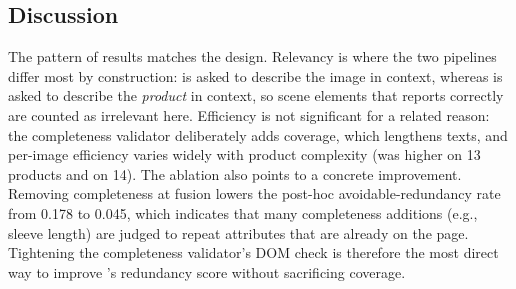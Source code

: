 \subsection{Discussion}
The pattern of results matches the design. Relevancy is where the two pipelines differ most by construction: \base is asked to describe the image in context, whereas \sys is asked to describe the \emph{product} in context, so scene elements that \base reports correctly are counted as irrelevant here. Efficiency is not significant for a related reason: the completeness validator deliberately adds coverage, which lengthens \sys texts, and per-image efficiency varies widely with product complexity (\sys was higher on 13 products and \base on 14). The ablation also points to a concrete improvement. Removing completeness at fusion lowers the post-hoc avoidable-redundancy rate from 0.178 to 0.045, which indicates that many completeness additions (e.g., sleeve length) are judged to repeat attributes that are already on the page. Tightening the completeness validator's DOM check is therefore the most direct way to improve \sys's redundancy score without sacrificing coverage.
